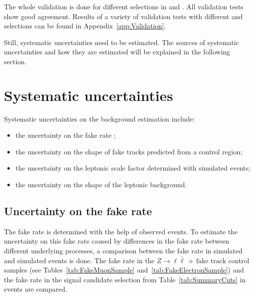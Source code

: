 The whole validation is done for different selections in \pt and \ias.
All validation tests show good agreement.
Results of a variety of validation tests with different \pt and \ias selections can be found in Appendix~\ref{app:Validation}.

Still, systematic uncertainties need to be estimated.
The sources of systematic uncertainties and how they are estimated will be explained in the following section.

\section{Systematic uncertainties}
\label{sec:SysUncertaintiesBkg}

Systematic uncertainties on the background estimation include:
\begin{itemize}
\item the uncertainty on the fake rate \fakerate;
\item the uncertainty on the \ias shape of fake tracks predicted from a control region;
\item the uncertainty on the leptonic scale factor \leptonscalefactor determined with simulated events;
\item the uncertainty on the \ias shape of the leptonic background.
\end{itemize}

\subsection{Uncertainty on the fake rate}
\label{sec:FakeRateUncertainty}
The fake rate \fakerate is determined with the help of observed \Zlep events.
To estimate the uncertainty on this fake rate caused by differences in the fake rate between different underlying processes, a comparison between the fake rate in simulated \ZlepJets and simulated \WJets events is done.
The fake rate in the $Z\rightarrow\ell \bar{\ell}\,+\,\text{fake track}$  control samples (see Tables~\ref{tab:FakeMuonSample} and~\ref{tab:FakeElectronSample}) 
and the fake rate in the signal candidate selection from Table~\ref{tab:SummaryCuts} in \WJets events are compared.

